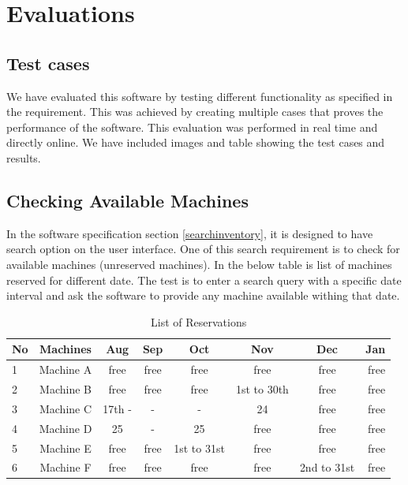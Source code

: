 \chapter{Evaluations} 
\label{chap:refs}
\label{chap:ch5_abbr}
\section{Test cases}
We have evaluated this software by testing different functionality as specified in the requirement. This was achieved by creating multiple cases that proves the performance of the software. This evaluation was performed in real time and directly online. We have included images and table showing the test cases and results. 
\section*{Checking Available Machines}
In the software specification section \ref{searchinventory}, it is designed to have search option on the user interface. One of this search requirement is to check for available machines (unreserved machines). In the below table is list of machines reserved for different date. The test is to enter a search query with a specific date interval and ask the software to provide any machine available withing that date.

\begin{table}[h!]
  \centering
  \label{tab:table1}
  \begin{tabular}{l|c||c||c||c||c||c||r}
    No & Machines & Aug & Sep & Oct & Nov & Dec & Jan \\
    \hline
    1 &Machine A & free & free & free & free & free & free\\
    2 &Machine B & free & free & free & 1st to 30th & free & free\\
    3 &Machine C & 17th - & - & - & 24 & free & free\\
    4 &Machine D & 25 & - & 25 & free & free & free\\
    5 &Machine E & free & free & 1st to 31st & free & free & free\\
    6 &Machine F & free & free & free & free & 2nd to 31st & free\\
  \end{tabular}
  \caption{List of Reservations}
\end{table}

